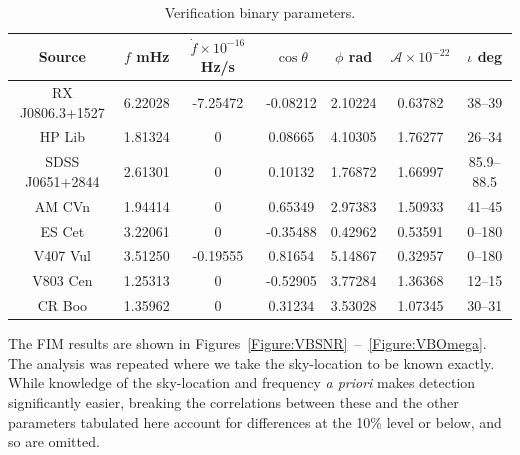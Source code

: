 \documentclass{iopart}
\begin{document}
\begin{table}[H]
\begin{center}
\begin{tabular}{ccccccc}
\hline\hline
Source & $f$ mHz & $\dot{f}\times 10^{-16}$ Hz/s & $\cos\theta$ & $\phi$ rad & $\mathcal{A}\times10^{-22}$ & $\iota$ deg\\
\hline

RX J0806.3+1527 & 6.22028 & -7.25472 & -0.08212 & 2.10224 & 0.63782 & 38--39\\

HP Lib & 1.81324 & 0 & 0.08665 & 4.10305 & 1.76277 & 26--34\\

SDSS J0651+2844 & 2.61301 & 0 & 0.10132 & 1.76872 & 1.66997 & 85.9--88.5\\

AM CVn & 1.94414 & 0  & 0.65349 & 2.97383 & 1.50933 & 41--45\\

ES Cet  & 3.22061 & 0 & -0.35488 & 0.42962 & 0.53591 & 0--180\\

V407 Vul & 3.51250 & -0.19555 & 0.81654 & 5.14867 & 0.32957 & 0--180\\

V803 Cen & 1.25313 & 0 & -0.52905 & 3.77284 & 1.36368 & 12--15\\

CR Boo & 1.35962 & 0 & 0.31234 & 3.53028 & 1.07345 & 30--31

\end{tabular}
\caption{Verification binary parameters.}
\label{Table:VB}
\end{center}
\end{table}

The FIM results are shown in Figures~\ref{Figure:VBSNR}~--~\ref{Figure:VBOmega}.  
The analysis was repeated where we take the sky-location to be known exactly.  While knowledge of the sky-location and frequency \emph{a 
priori} makes detection significantly easier, breaking the correlations between these and the other parameters tabulated here account for 
differences at the 10\% level or below, and so are omitted.
\end{document}
